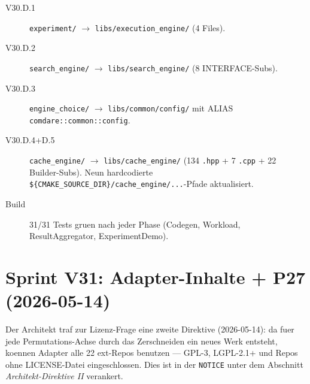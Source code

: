 \begin{description}
    \item[V30.D.1] \texttt{experiment/} $\rightarrow$
          \texttt{libs/execution\_engine/} (4 Files).
    \item[V30.D.2] \texttt{search\_engine/} $\rightarrow$
          \texttt{libs/search\_engine/} (8 INTERFACE-Subs).
    \item[V30.D.3] \texttt{engine\_choice/} $\rightarrow$
          \texttt{libs/common/config/} mit ALIAS
          \texttt{comdare::common::config}.
    \item[V30.D.4+D.5] \texttt{cache\_engine/} $\rightarrow$
          \texttt{libs/cache\_engine/} (134 \texttt{.hpp} + 7
          \texttt{.cpp} + 22 Builder-Subs). Neun hardcodierte
          \texttt{\$\{CMAKE\_SOURCE\_DIR\}/cache\_engine/...}-Pfade
          aktualisiert.
    \item[Build] 31/31 Tests gruen nach jeder Phase
          (Codegen, Workload, ResultAggregator, ExperimentDemo).
\end{description}

\section{Sprint V31: Adapter-Inhalte + P27 (2026-05-14)}

Der Architekt traf zur Lizenz-Frage eine zweite Direktive
(2026-05-14): da fuer jede Permutations-Achse durch das Zerschneiden
ein neues Werk entsteht, koennen Adapter alle 22 ext-Repos benutzen ---
GPL-3, LGPL-2.1+ und Repos ohne LICENSE-Datei eingeschlossen. Dies ist
in der \texttt{NOTICE} unter dem Abschnitt \emph{Architekt-Direktive II}
verankert.

